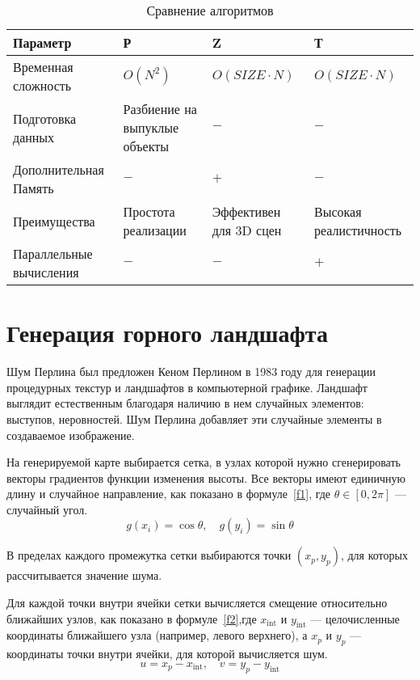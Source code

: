 \begin{table}[h!]
        \small
        \captionsetup{justification=raggedright, singlelinecheck=false, labelsep=endash}
		\caption{Сравнение алгоритмов}
		
		\label{tbl:comparing_algorithms}
		\begin{tabular}{|p{3cm}|p{3cm}|p{3cm}|p{5cm}|}
			 \hline
             Параметр & Р & Z & Т \\
             \hline
             Временная сложность & $O(N^2)$ & $O(SIZE \cdot N)$ & $O(SIZE \cdot N)$ \\
             \hline
             Подготовка данных & Разбиение на выпуклые объекты & $-$ & $-$ \\
             \hline
             Дополнительная Память & $-$ & $+$ & $-$ \\
             \hline
             Преимущества & Простота реализации & Эффективен для 3D сцен & Высокая реалистичность \\
             \hline
             Параллельные вычисления & $-$ & $-$ & $+$ \\ 
             \hline
		\end{tabular}
\end{table}

\section{Генерация горного ландшафта}
Шум Перлина был предложен Кеном Перлином в 1983 году для генерации процедурных текстур и ландшафтов в компьютерной графике. Ландшафт выглядит естественным благодаря наличию в нем случайных элементов: выступов, неровностей. Шум Перлина добавляет эти случайные элементы в создаваемое изображение.

На генерируемой карте выбирается сетка, в узлах которой нужно сгенерировать векторы градиентов функции изменения высоты. Все векторы имеют единичную длину и случайное направление, как показано в формуле~\ref{f1}, где $\theta \in [0, 2\pi]$ — случайный угол.
\begin{equation}
g(x_i) = \cos{\theta} , \quad
g(y_i) = \sin{\theta}
\label{f1}
\end{equation}

В пределах каждого промежутка сетки выбираются точки $(x_p, y_p)$, для которых рассчитывается значение шума.

Для каждой точки внутри ячейки сетки вычисляется смещение относительно ближайших узлов, как показано в формуле~\ref{f2},где $x_{\text{int}}$ и $y_{\text{int}}$ — целочисленные координаты ближайшего узла (например, левого верхнего), а $x_p$ и $y_p$ — координаты точки внутри ячейки, для которой вычисляется шум.
\begin{equation}
u = x_p - x_{\text{int}}, \quad v = y_p - y_{\text{int}}
\label{f2}
\end{equation}


